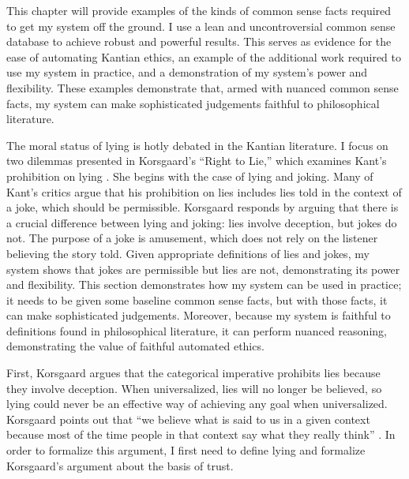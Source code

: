 \begin{isabellebody}
\begin{isamarkuptext}
This chapter will provide examples of the kinds of common sense facts required to get my system
off the ground. I use a lean and uncontroversial common sense database
to achieve robust and powerful results. This serves as evidence for the ease of automating
Kantian ethics, an example of the additional work required to use my system in practice, and a 
demonstration of my system's power and flexibility. These examples demonstrate that, armed with nuanced 
common sense facts, my system can make sophisticated judgements faithful to philosophical literature.%
\end{isamarkuptext}\isamarkuptrue%
%
\isadelimdocument
%
\endisadelimdocument
%
\isatagdocument
%
\isamarkuptrue%
%
\endisatagdocument
{\isafolddocument}%
%
\isadelimdocument
%
\endisadelimdocument
%
\begin{isamarkuptext}%
The moral status of lying is hotly debated in the Kantian literature. I focus on two dilemmas
presented in Korsgaard's ``Right to Lie,'' which 
examines Kant's prohibition on lying \citep{KorsgaardRTL}. She begins with the case of 
lying and joking. Many of Kant's critics argue that his prohibition on lies includes lies told in 
the context of a joke, which should be permissible. Korsgaard responds by arguing 
that there is a crucial difference between lying and joking: lies involve deception, but jokes do not. 
The purpose of a joke is amusement, which does not rely on the listener believing the story told. 
Given appropriate definitions of lies and jokes, my system shows that jokes are permissible but lies 
are not, demonstrating its power and flexibility. This section demonstrates how my system can be used 
in practice; it needs to be given some baseline common sense facts, but with those facts, it can make 
sophisticated judgements. Moreover, because my system is faithful to definitions found in philosophical 
literature, it can perform nuanced reasoning, demonstrating the value of faithful automated ethics. 

First, Korsgaard argues that the categorical imperative prohibits lies because they involve deception. 
When universalized, lies will no longer be believed, so lying could never be an effective way of achieving 
any goal when universalized. Korsgaard points out that ``we believe what is said to us in a given 
context because most of the time people in that context say what they really think'' \citep[4]{KorsgaardRTL}. 
In order to formalize this argument, I first need to define lying and formalize Korsgaard's argument 
about the basis of trust.


\end{isamarkuptext}
\end{isabellebody}
